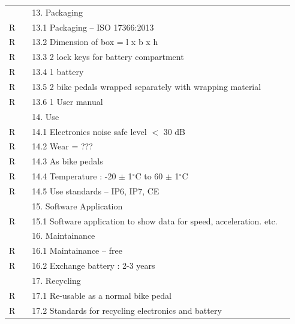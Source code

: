 \documentclass{article}
\begin{document}
\begin{longtable}{|C{1cm}|C{2cm}|L{9.56cm}|L{4cm}|}
		\hline
		
		
		& & 13. Packaging & \\
		R & & \hspace{1mm} 13.1 Packaging -- ISO 17366:2013 & \\
		R & & \hspace{1mm} 13.2 Dimension of box = l x b x h & \\
		R & & \hspace{1mm} 13.3 2 lock keys for battery compartment & \\
		R & & \hspace{1mm} 13.4 1 battery  & \\
		R & & \hspace{1mm} 13.5 2 bike pedals wrapped separately with wrapping material  & \\
		R & & \hspace{1mm} 13.6 1 User manual  & \\
		\hline
		& & 14. Use & \\
		R & & \hspace{1mm} 14.1 Electronics noise safe level $<$ 30 dB & \\
		R & & \hspace{1mm} 14.2 Wear = ??? & \\
		R & & \hspace{1mm} 14.3 As bike pedals & \\
		R & & \hspace{1mm} 14.4 Temperature : -20 $\pm$ 1$^{\circ}$C to 60 $\pm$ 1$^{\circ}$C  & \\
		R & & \hspace{1mm} 14.5 Use standards -- IP6, IP7, CE & \\
		\hline
		& & 15. Software Application & \\
		R& & 15.1 Software application to show data for speed, acceleration. etc.& \\
		\hline 
		& & 16. Maintainance & \\
		R & & \hspace{1mm} 16.1 Maintainance -- free & \\
		R & & \hspace{1mm} 16.2 Exchange battery : 2-3 years & \\
		\hline
		& & 17. Recycling & \\
		R & & \hspace{1mm} 17.1 Re-usable as a normal bike pedal & \\
		R & & \hspace{1mm} 17.2 Standards for recycling electronics and battery & \\

\end{longtable}
\end{document}
